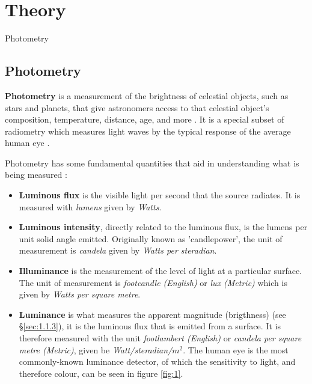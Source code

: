 \documentclass[12pt]{article}
\begin{document}

\section{Theory} \label{sec:1}

Photometry 

\subsection{Photometry} \label{sec:1.1}

\textbf{Photometry} is a measurement of the brightness of celestial objects, such as stars and planets, that give astronomers access to that celestial object's composition,
temperature, distance, age, and more
\cite{britphoto}.
It is a special subset of radiometry which measures light waves by the typical response of the average human eye
\cite{mictechphoto, photophoto}.

Photometry has some fundamental quantities that aid in understanding what is being measured \cite{WYATT197815,photophoto}:

\begin{itemize}
    \item \textbf{Luminous flux} is the visible light per second that the source radiates. It is measured with \textit{lumens} given by \textit{Watts}.
    \item \textbf{Luminous intensity}, directly related to the luminous flux, is the lumens per unit solid angle emitted. Originally known as 'candlepower', the unit of measurement
    is \textit{candela} given by \textit{Watts per steradian}.
    \item \textbf{Illuminance} is the measurement of the level of light at a particular surface. The unit of measurement is \textit{footcandle (English)} or \textit{lux (Metric)} which is
    given by \textit{Watts per square metre}.
    \item \textbf{Luminance} is what measures the apparent magnitude (brigthness) (see §\ref{sec:1.1.3}), it is the luminous flux that is emitted from a surface.
    It is therefore measured with the unit \textit{footlambert (English)} or \textit{candela per square metre (Metric)}, given be \textit{Watt/steradian/}$m^2$.
    The human eye is the most commonly-known luminance detector, of which the sensitivity to light, and therefore colour, can be seen in figure {\ref{fig:1}}.
\end{itemize}
\end{document}
